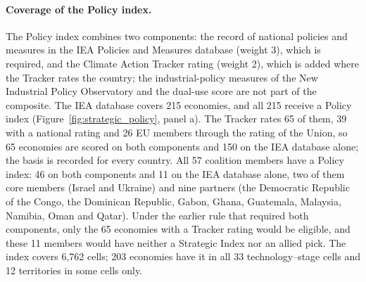 
\paragraph{Coverage of the Policy index.} The Policy index combines two components: the record of
national policies and measures in the IEA Policies and Measures database \citep{iea2026pams}
(weight 3), which is required, and the Climate Action Tracker rating \citep{cat2026ratings}
(weight 2), which is added where the Tracker rates the country; the industrial-policy measures of
the New Industrial Policy Observatory and the dual-use score are not part of the composite. The
IEA database covers 215 economies, and all 215 receive a Policy index
(Figure~\ref{fig:strategic_policy}, panel a). The Tracker rates 65 of them, 39 with a national
rating and 26 EU members through the rating of the Union, so 65 economies are scored on both
components and 150 on the IEA database alone; the basis is recorded for every country. All 57
coalition members have a Policy index: 46 on both components and 11 on the IEA database alone, two
of them core members (Israel and Ukraine) and nine partners (the Democratic Republic of the Congo,
the Dominican Republic, Gabon, Ghana, Guatemala, Malaysia, Namibia, Oman and Qatar). Under the
earlier rule that required both components, only the 65 economies with a Tracker rating would be
eligible, and these 11 members would have neither a Strategic Index nor an allied pick. The index
covers 6,762 cells; 203 economies have it in all 33 technology--stage cells and 12 territories in
some cells only.

